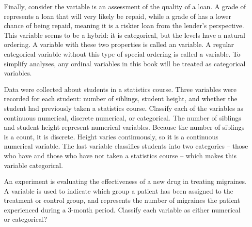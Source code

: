 Finally, consider the  variable is an assessment
of the quality of a loan. A grade of  represents
a loan that will very likely be repaid, while a grade of
 has a lower chance of being repaid, meaning it is
a riskier loan from the lender's perspective.
This variable seems to be a hybrid:
it is categorical, but the levels have a natural ordering.
A variable with these two properties is called an
 variable.
A regular categorical variable without this type of special
ordering is called a  variable.
To simplify analyses, any ordinal variables in this book
will be treated as categorical variables.

\begin{examplewrap}
\begin{nexample}{Data were collected about students in a statistics course. Three variables were recorded for each student: number of siblings, student height, and whether the student had previously taken a statistics course. Classify each of the variables as continuous numerical, discrete numerical, or categorical.}
The number of siblings and student height represent numerical variables. Because the number of siblings is a count, it is discrete. Height varies continuously, so it is a continuous numerical variable. The last variable classifies students into two categories -- those who have and those who have not taken a statistics course -- which makes this variable categorical.
\end{nexample}
\end{examplewrap}


\begin{exercisewrap}
\begin{nexercise}%
An experiment is evaluating the effectiveness of a new drug
in treating migraines.
A  variable is used to indicate which group a patient
has been assigned to the treatment or control group,
and  represents the number of migraines the
patient experienced during a 3-month period.
Classify each variable as either numerical or
categorical?\footnotemark
\end{nexercise}
\end{exercisewrap}

